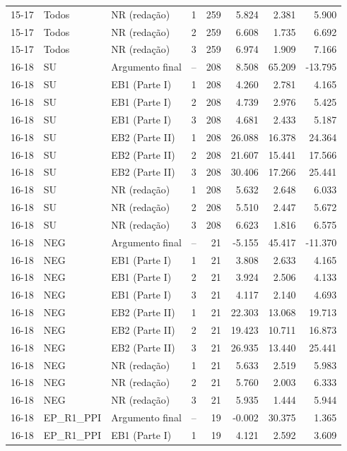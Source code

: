 \begin{longtable}{lllcrrrr}
15-17 & Todos & NR (redação) & 1 & 259 & 5.824 & 2.381 & 5.900 \\
15-17 & Todos & NR (redação) & 2 & 259 & 6.608 & 1.735 & 6.692 \\
15-17 & Todos & NR (redação) & 3 & 259 & 6.974 & 1.909 & 7.166 \\
\midrule
16-18 & SU & Argumento final & -- & 208 & 8.508 & 65.209 & -13.795 \\
16-18 & SU & EB1 (Parte I) & 1 & 208 & 4.260 & 2.781 & 4.165 \\
16-18 & SU & EB1 (Parte I) & 2 & 208 & 4.739 & 2.976 & 5.425 \\
16-18 & SU & EB1 (Parte I) & 3 & 208 & 4.681 & 2.433 & 5.187 \\
16-18 & SU & EB2 (Parte II) & 1 & 208 & 26.088 & 16.378 & 24.364 \\
16-18 & SU & EB2 (Parte II) & 2 & 208 & 21.607 & 15.441 & 17.566 \\
16-18 & SU & EB2 (Parte II) & 3 & 208 & 30.406 & 17.266 & 25.441 \\
16-18 & SU & NR (redação) & 1 & 208 & 5.632 & 2.648 & 6.033 \\
16-18 & SU & NR (redação) & 2 & 208 & 5.510 & 2.447 & 5.672 \\
16-18 & SU & NR (redação) & 3 & 208 & 6.623 & 1.816 & 6.575 \\
16-18 & NEG & Argumento final & -- & 21 & -5.155 & 45.417 & -11.370 \\
16-18 & NEG & EB1 (Parte I) & 1 & 21 & 3.808 & 2.633 & 4.165 \\
16-18 & NEG & EB1 (Parte I) & 2 & 21 & 3.924 & 2.506 & 4.133 \\
16-18 & NEG & EB1 (Parte I) & 3 & 21 & 4.117 & 2.140 & 4.693 \\
16-18 & NEG & EB2 (Parte II) & 1 & 21 & 22.303 & 13.068 & 19.713 \\
16-18 & NEG & EB2 (Parte II) & 2 & 21 & 19.423 & 10.711 & 16.873 \\
16-18 & NEG & EB2 (Parte II) & 3 & 21 & 26.935 & 13.440 & 25.441 \\
16-18 & NEG & NR (redação) & 1 & 21 & 5.633 & 2.519 & 5.983 \\
16-18 & NEG & NR (redação) & 2 & 21 & 5.760 & 2.003 & 6.333 \\
16-18 & NEG & NR (redação) & 3 & 21 & 5.935 & 1.444 & 5.944 \\
16-18 & EP\_R1\_PPI & Argumento final & -- & 19 & -0.002 & 30.375 & 1.365 \\
16-18 & EP\_R1\_PPI & EB1 (Parte I) & 1 & 19 & 4.121 & 2.592 & 3.609 \\

\end{longtable}
